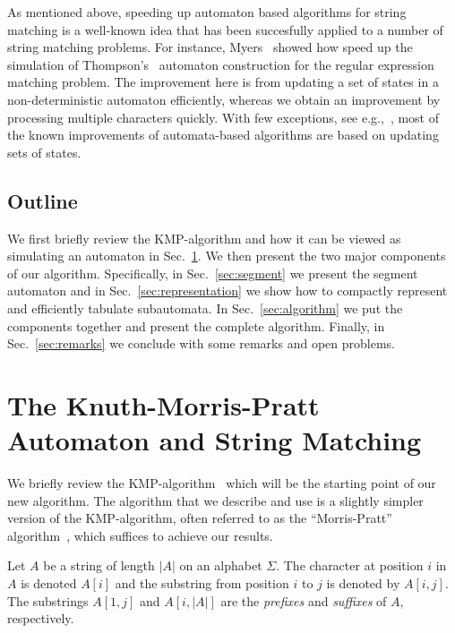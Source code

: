 \documentclass{article}
\begin{document}
As mentioned above, speeding up automaton based algorithms for string
matching is a well-known idea that has been succesfully applied to a
number of string matching problems. For instance,
Myers~\cite{Myers1992} showed how speed up the simulation of
Thompson's~\cite{Thomp1968} automaton construction for the regular
expression matching problem. The improvement here is from updating a
set of states in a non-deterministic automaton efficiently, whereas we
obtain an improvement by processing multiple characters quickly.  With
few exceptions, see e.g.,~\cite{MP1980, BT2009}, most of the known
improvements of automata-based algorithms are based on updating sets
of states. 


\subsection{Outline}
We first briefly review the KMP-algorithm and how it can be viewed as
simulating an automaton in Sec.~\ref{sec:KMP}. We then present the
two major components of our algorithm. Specifically, in
Sec.~\ref{sec:segment} we present the segment automaton and in
Sec.~\ref{sec:representation} we show how to compactly represent
and efficiently tabulate subautomata. In Sec.~\ref{sec:algorithm}
we put the components together and present the complete
algorithm. Finally, in Sec.~\ref{sec:remarks} we conclude with some
remarks and open problems.



\section{The Knuth-Morris-Pratt Automaton and String Matching}\label{sec:KMP}
We briefly review the KMP-algorithm~\cite{KMP1977} which will be the
starting point of our new algorithm. The algorithm that we describe
and use is a slightly simpler version of the KMP-algorithm, often
referred to as the ``Morris-Pratt'' algorithm~\cite{MP1970}, which
suffices to achieve our results.


Let $A$ be a string of length $|A|$ on an alphabet $\Sigma$. The
character at position $i$ in $A$ is denoted $A[i]$ and the substring
from position $i$ to $j$ is denoted by $A[i,j]$. The substrings
$A[1,j]$ and $A[i, |A|]$ are the \emph{prefixes} and \emph{suffixes}
of $A$, respectively.
\end{document}
